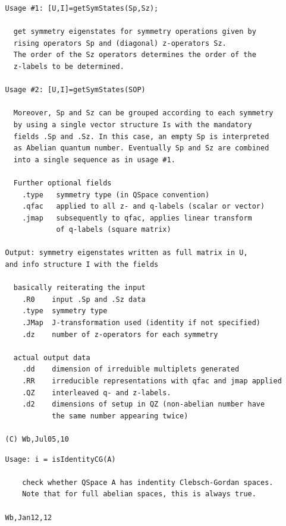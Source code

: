 \documentclass[twoside,12pt]{article}
\begin{document}

\begin{verbatim}
   Usage #1: [U,I]=getSymStates(Sp,Sz);
 
     get symmetry eigenstates for symmetry operations given by
     rising operators Sp and (diagonal) z-operators Sz.
     The order of the Sz operators determines the order of the
     z-labels to be determined.
 
   Usage #2: [U,I]=getSymStates(SOP)
 
     Moreover, Sp and Sz can be grouped according to each symmetry
     by using a single vector structure Is with the mandatory
     fields .Sp and .Sz. In this case, an empty Sp is interpreted
     as Abelian quantum number. Eventually Sp and Sz are combined
     into a single sequence as in usage #1.
 
     Further optional fields
       .type   symmetry type (in QSpace convention)
       .qfac   applied to all z- and q-labels (scalar or vector)
       .jmap   subsequently to qfac, applies linear transform
               of q-labels (square matrix)
 
   Output: symmetry eigenstates written as full matrix in U,
   and info structure I with the fields
 
     basically reiterating the input
       .R0    input .Sp and .Sz data
       .type  symmetry type
       .JMap  J-transformation used (identity if not specified)
       .dz    number of z-operators for each symmetry
 
     actual output data
       .dd    dimension of irreduible multiplets generated
       .RR    irreducible representations with qfac and jmap applied
       .QZ    interleaved q- and z-labels.
       .d2    dimensions of setup in QZ (non-abelian number have
              the same number appearing twice)
 
   (C) Wb,Jul05,10
\end{verbatim}

\pagebreak[3]



\begin{verbatim}
   Usage: i = isIdentityCG(A)
 
       check whether QSpace A has indentity Clebsch-Gordan spaces.
       Note that for full abelian spaces, this is always true.
 
   Wb,Jan12,12
\end{verbatim}

\pagebreak[3]
\end{document}
